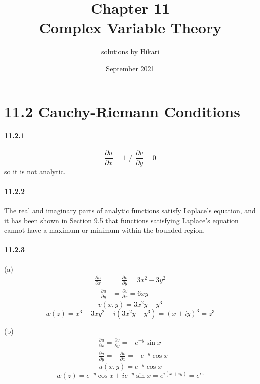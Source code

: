 \documentclass[a4paper]{article}
\title{Chapter 11\\Complex Variable Theory}
\author{solutions by Hikari}
\date{September 2021}
\begin{document}
\newcommand{\pdv}[2]{\frac{\partial#1}{\partial#2}}
\newcommand{\V}{\mathbf}
\newcommand{\del}{\boldsymbol{\nabla}}

\def\Xint#1{\mathchoice
   {\XXint\displaystyle\textstyle{#1}}%
   {\XXint\textstyle\scriptstyle{#1}}%
   {\XXint\scriptstyle\scriptscriptstyle{#1}}%
   {\XXint\scriptscriptstyle\scriptscriptstyle{#1}}%
   \!\int}
\def\XXint#1#2#3{{\setbox0=\hbox{$#1{#2#3}{\int}$}
     \vcenter{\hbox{$#2#3$}}\kern-.5\wd0}}
\def\ddashint{\Xint{\;\,-}}
\def\dashint{\Xint-}


\maketitle

\section*{11.2 Cauchy-Riemann Conditions}

\paragraph{11.2.1}
\[
\pdv{u}{x}=1\neq\pdv{v}{y}=0
\]
so it is not analytic.

\paragraph{11.2.2}
The real and imaginary parts of analytic functions satisfy Laplace's equation, and it has been shown in Section 9.5 that functions satisfying Laplace's equation cannot have a maximum or minimum within the bounded region.

\paragraph{11.2.3}
(a)
\begin{align*}
    \pdv{u}{x} & =\pdv{v}{y}=3x^2-3y^2\\
    -\pdv{u}{y} & =\pdv{v}{x}=6xy
\end{align*}
\[
v(x,y)=3x^2y-y^3
\]
\[
w(z)=x^3-3xy^2+i(3x^2y-y^3)=(x+iy)^3=z^3
\]

(b)
\begin{align*}
    & \pdv{u}{x}=\pdv{v}{y}=-e^{-y}\sin x\\
    & \pdv{u}{y}=-\pdv{v}{x}=-e^{-y}\cos x
\end{align*}
\[
u(x,y)=e^{-y}\cos x
\]
\[
w(z)=e^{-y}\cos x+ie^{-y}\sin x=e^{i(x+iy)}=e^{iz}
\]
\end{document}
